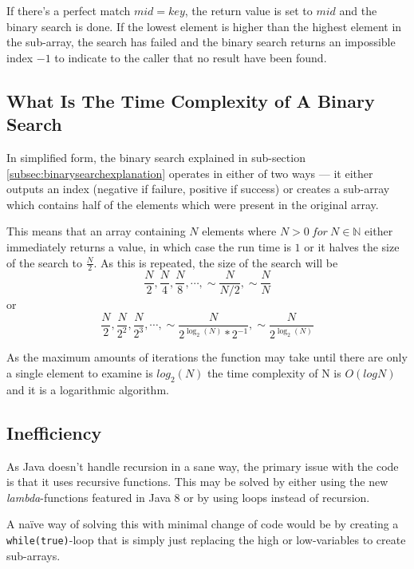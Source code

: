 \documentclass[a4paper,11pt]{article}
\begin{document}
If there's a perfect match $mid = key$, the return value is set to $mid$ and the binary search is done. If the lowest element is higher than the highest element in the sub-array, the search has failed and the binary search returns an impossible index $-1$ to indicate to the caller that no result have been found.

\subsection{What Is The Time Complexity of A Binary Search}
\label{subsec:binsearchtime}
In simplified form, the binary search explained in sub-section \ref{subsec:binarysearchexplanation} operates in either of two ways --- it either outputs an index (negative if failure, positive if success) or creates a sub-array which contains half of the elements which were present in the original array.

This means that an array containing $N$ elements where $N > 0\ for\  N \in \mathbb{N}$ either immediately returns a value, in which case the run time is $1$ or it halves the size of the search to $\frac{N}{2}$. As this is repeated, the size of the search will be $$\frac{N}{2}, \frac{N}{4}, \frac{N}{8}, \cdots, \sim \frac{N}{N/2}, \sim \frac{N}{N}$$ or $$\frac{N}{2}, \frac{N}{2^2}, \frac{N}{2^3}, \cdots, \sim \frac{N}{2^{\log_{2}{(N)}}*2^{-1}}, \sim \frac{N}{2^{\log_{2}{(N)}}}$$

As the maximum amounts of iterations the function may take until there are only a single element to examine is $log_{2}{(N)}$ the time complexity of N is $O(log{N})$ and it is a logarithmic algorithm.

\subsection{Inefficiency}
As Java doesn't handle recursion in a sane way, the primary issue with the code is that it uses recursive functions. This may be solved by either using the new \textit{lambda}-functions featured in Java 8 or by using loops instead of recursion.

A naïve way of solving this with minimal change of code would be by creating a \texttt{while(true)}-loop that is simply just replacing the high or low-variables to create sub-arrays.
\end{document}
